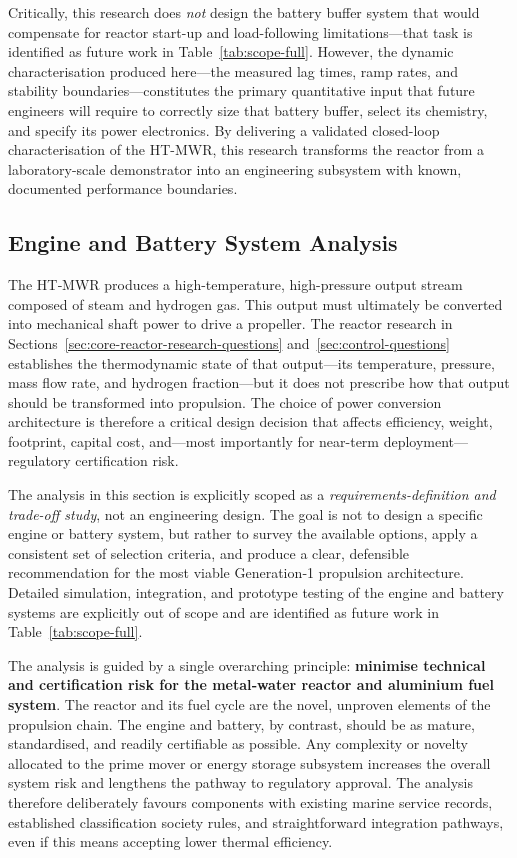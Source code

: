 \documentclass[12pt]{article}
\begin{document}
Critically, this research does \emph{not} design the battery buffer system that would compensate for reactor start-up and load-following limitations---that task is identified as future work in Table~\ref{tab:scope-full}. However, the dynamic characterisation produced here---the measured lag times, ramp rates, and stability boundaries---constitutes the primary quantitative input that future engineers will require to correctly size that battery buffer, select its chemistry, and specify its power electronics. By delivering a validated closed-loop characterisation of the HT-MWR, this research transforms the reactor from a laboratory-scale demonstrator into an engineering subsystem with known, documented performance boundaries.

\break

\subsection{Engine and Battery System Analysis}
\label{sec:engine-battery-questions}

The HT‑MWR produces a high-temperature, high-pressure output stream composed of steam and hydrogen gas. This output must ultimately be converted into mechanical shaft power to drive a propeller. The reactor research in Sections~\ref{sec:core-reactor-research-questions} and~\ref{sec:control-questions} establishes the thermodynamic state of that output---its temperature, pressure, mass flow rate, and hydrogen fraction---but it does not prescribe how that output should be transformed into propulsion. The choice of power conversion architecture is therefore a critical design decision that affects efficiency, weight, footprint, capital cost, and---most importantly for near-term deployment---regulatory certification risk.

The analysis in this section is explicitly scoped as a \emph{requirements-definition and trade-off study}, not an engineering design. The goal is not to design a specific engine or battery system, but rather to survey the available options, apply a consistent set of selection criteria, and produce a clear, defensible recommendation for the most viable Generation‑1 propulsion architecture. Detailed simulation, integration, and prototype testing of the engine and battery systems are explicitly out of scope and are identified as future work in Table~\ref{tab:scope-full}.

The analysis is guided by a single overarching principle: \textbf{minimise technical and certification risk for the metal‑water reactor and aluminium fuel system}. The reactor and its fuel cycle are the novel, unproven elements of the propulsion chain. The engine and battery, by contrast, should be as mature, standardised, and readily certifiable as possible. Any complexity or novelty allocated to the prime mover or energy storage subsystem increases the overall system risk and lengthens the pathway to regulatory approval. The analysis therefore deliberately favours components with existing marine service records, established classification society rules, and straightforward integration pathways, even if this means accepting lower thermal efficiency.
\end{document}
